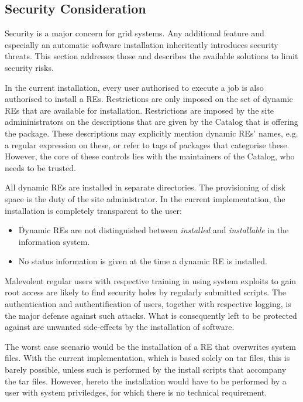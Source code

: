 \subsection{Security Consideration}



Security is a major concern for grid systems. Any additional feature
and especially an automatic software
installation inheritently introduces security threats. This section
addresses those and describes the available solutions to limit
security risks.

In the current installation, every user authorised to execute a job is
also authorised to install a REs. Restrictions are
only imposed on the set of dynamic REs that are available for installation.
Restrictions are imposed by the site admininistrators on the descriptions
that are given by the Catalog that is offering the package. These
descriptions may explicitly mention dynamic REs' names, e.g. a regular expression on
these, or refer to tags of packages that categorise these. However,
the core of these controls lies with the maintainers of the Catalog,
who needs to be trusted.

All dynamic REs are installed in separate directories. The provisioning of
disk space is the duty of the site administrator.  In the current
implementation, the installation is completely transparent to the user:

\begin{itemize}
\item Dynamic REs are not distinguished between {\em installed} and
  {\em installable} in the information system.
\item No status information is given at the time a dynamic RE is installed.
\end{itemize}

Malevolent regular users with respective training in using system exploits
to gain root access are likely to find security holes by regularly
submitted scripts.  The authentication and authentification of users,
together with respective logging, is the major defense against such
attacks. What is consequently left to be protected against are unwanted
side-effects by the installation of software.

The worst case scenario would be the installation of a RE
that overwrites system files. With the current implementation, which is
based solely on tar files, this is barely possible, unless such is
performed by the install scripts that accompany the tar files. However,
hereto the installation would have to be performed by a user with system
priviledges, for which there is no technical requirement.

